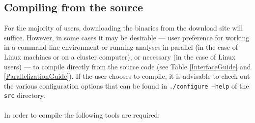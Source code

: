\subsection{Compiling from the source}
\label{Compilingfromsource}

For the majority of users, downloading the binaries from the \poy download site will suffice.  However, in 
some cases it may be %
 desirable --- user preference for working in a command-line environment or running \poy analyses in parallel 
 (in the case of Linux machines or on a cluster computer), or necessary (in the case of Linux users) --- to compile 
 \poy directly from the source code (see Table \ref{InterfaceGuide} and \ref{ParallelizationGuide}). 
 If the user chooses to compile, it is advisable to check out the various configuration 
  options that can be found in {\tt ./configure --help} of the \texttt {src} directory. \\
\\
In order to compile \poy the following tools are required:

